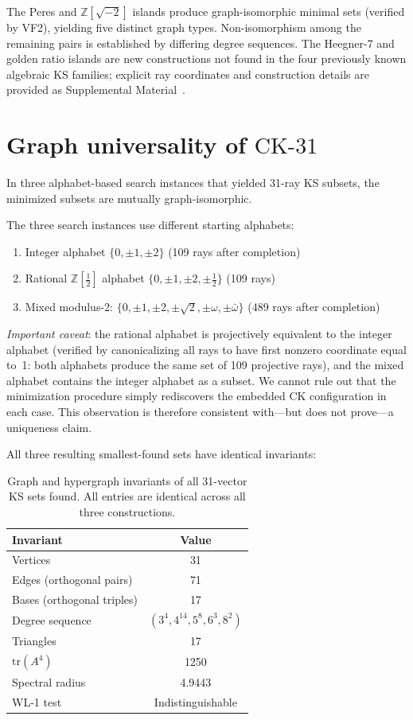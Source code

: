\documentclass[twocolumn,prl,superscriptaddress,nofootinbib]{revtex4-2}
\newcommand{\Z}{\mathbb{Z}}
\newcommand{\CK}{\mathrm{CK}\text{-}31}
\begin{document}
The Peres and $\Z[\sqrt{-2}]$ islands produce graph-isomorphic minimal sets (verified by VF2), yielding five distinct graph types. Non-isomorphism among the remaining pairs is established by differing degree sequences. The Heegner-7 and golden ratio islands are new constructions not found in the four previously known algebraic KS families; explicit ray coordinates and construction details are provided as Supplemental Material~\cite{SupplementalMaterial}.

\section{Graph universality of $\CK$}

In three alphabet-based search instances that yielded 31-ray KS subsets, the minimized subsets are mutually graph-isomorphic.

The three search instances use different starting alphabets:
\begin{enumerate}
\item Integer alphabet $\{0, \pm 1, \pm 2\}$ (109 rays after completion)
\item Rational $\Z[\tfrac{1}{2}]$ alphabet $\{0, \pm 1, \pm 2, \pm\tfrac{1}{2}\}$ (109 rays)
\item Mixed modulus-2: $\{0, \pm 1, \pm 2, \pm\sqrt{2}, \pm\omega, \pm\bar\omega\}$ (489 rays after completion)
\end{enumerate}

\emph{Important caveat}: the rational alphabet is projectively equivalent to the integer alphabet (verified by canonicalizing all rays to have first nonzero coordinate equal to~1: both alphabets produce the same set of 109 projective rays), and the mixed alphabet contains the integer alphabet as a subset. We cannot rule out that the minimization procedure simply rediscovers the embedded CK configuration in each case. This observation is therefore consistent with---but does not prove---a uniqueness claim.

All three resulting smallest-found sets have identical invariants:

\begin{table}[h]
\centering
\caption{Graph and hypergraph invariants of all 31-vector KS sets found. All entries are identical across all three constructions.}
\label{tab:universality}
\begin{tabular}{lc}
\toprule
Invariant & Value \\
\midrule
Vertices & 31 \\
Edges (orthogonal pairs) & 71 \\
Bases (orthogonal triples) & 17 \\
Degree sequence & $(3^4, 4^{14}, 5^8, 6^3, 8^2)$ \\
Triangles & 17 \\
$\mathrm{tr}(A^4)$ & 1250 \\
Spectral radius & 4.9443 \\
WL-1 test & Indistinguishable \\
\bottomrule
\end{tabular}
\end{table}
\end{document}
